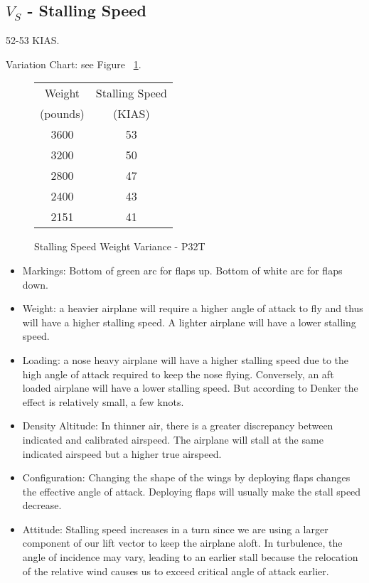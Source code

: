 \subsection{$V_{S}$ - Stalling Speed}

52-53 KIAS.

Variation Chart: see Figure ~\ref{fig:StallSpeedsP32T}.

\begin{figure}
\begin{center}
\begin{tabular}{ |c|c| }
    \hline
    Weight & Stalling Speed \\
    (pounds) & (KIAS) \\
    \hline
     3600 &  53 \\
     3200 &  50 \\
    \hline
     2800 &  47 \\
     2400 &  43 \\
    \hline
     2151 &  41 \\
    \hline
\end{tabular}
\end{center}
\caption{Stalling Speed Weight Variance - P32T}
\label{fig:StallSpeedsP32T}
\end{figure}


\begin{itemize}
\item Markings: Bottom of green arc for flaps up. Bottom of white arc for flaps down.
\item Weight: a heavier airplane will require a higher angle of attack to fly and thus will have a higher stalling speed. A lighter airplane will have a lower stalling speed.
\item Loading: a nose heavy airplane will have a higher stalling speed due to the high angle of attack required to keep the nose flying. Conversely, an aft loaded airplane will have a lower stalling speed. But according to Denker the effect is relatively small, a few knots.
\item Density Altitude: In thinner air, there is a greater discrepancy between indicated and calibrated airspeed. The airplane will stall at the same indicated airspeed but a higher true airspeed.  
\item Configuration: Changing the shape of the wings by deploying flaps changes the effective angle of attack. Deploying flaps will usually make the stall speed decrease.
\item Attitude: Stalling speed increases in a turn since we are using a larger component of our lift vector to keep the airplane aloft. In turbulence, the angle of incidence may vary, leading to an earlier stall because the relocation of the relative wind causes us to exceed critical angle of attack earlier. 
\end{itemize}


